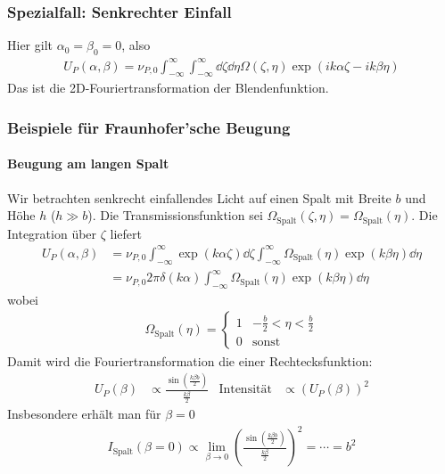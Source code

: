 \subsubsection[Senkrechter Einfall]%
{Spezialfall: Senkrechter Einfall}
Hier gilt $\alpha_0=\beta_0=0$, also
\begin{gather*}
  U_P(\alpha,\beta) 
  = \nu_{P,0} \int_{-\infty}^{\infty}\int_{-\infty}^{\infty}
  \dd\zeta\dd\eta \Omega(\zeta,\eta)
  \exp\left( ik\alpha\zeta - ik\beta\eta \right)
\end{gather*}
Das ist die 2D-Fouriertransformation der Blendenfunktion.

\subsubsection{Beispiele für Fraunhofer'sche Beugung}
\paragraph{Beugung am langen Spalt}
Wir betrachten senkrecht einfallendes Licht auf einen Spalt mit Breite
$b$ und Höhe $h$ ($h\gg b$). Die Transmissionsfunktion sei 
$\Omega_\text{Spalt}(\zeta,\eta) = \Omega_\text{Spalt}(\eta)$.
Die Integration über $\zeta$ liefert
\begin{align*}
  U_P(\alpha,\beta) 
  &= \nu_{P,0} 
    \int_{-\infty}^{\infty} \exp(k\alpha\zeta)\dd\zeta
    \int_{-\infty}^{\infty} \Omega_\text{Spalt}(\eta)\exp(k\beta\eta)\dd\eta\\
  &= \nu_{P,0} 2\pi\delta(k\alpha)
    \int_{-\infty}^{\infty} \Omega_\text{Spalt}(\eta)\exp(k\beta\eta)\dd\eta
\end{align*}
wobei
\begin{gather*}
  \Omega_\text{Spalt}(\eta) = 
  \begin{cases}
    1 & -\frac{b}{2} < \eta < \frac{b}{2}\\
    0 & \text{sonst}
  \end{cases}
\end{gather*}
Damit wird die Fouriertransformation die einer Rechtecksfunktion:
\begin{align*}
  U_P(\beta) 
  &\propto \frac{\sin(\frac{k\beta b}{2})}{\frac{k\beta}{2}}
  &\text{Intensität}
  &\propto (U_P(\beta))^2
\end{align*}
Insbesondere erhält man für $\beta=0$ 
\begin{gather*}
  I_\text{Spalt}(\beta=0) 
  \propto \lim_{\beta\to0} \left(
    \frac{\sin(\frac{k\beta b}{2})}{\frac{k\beta}{2}}
  \right)^2
  = \dotsb = b^2
\end{gather*}
